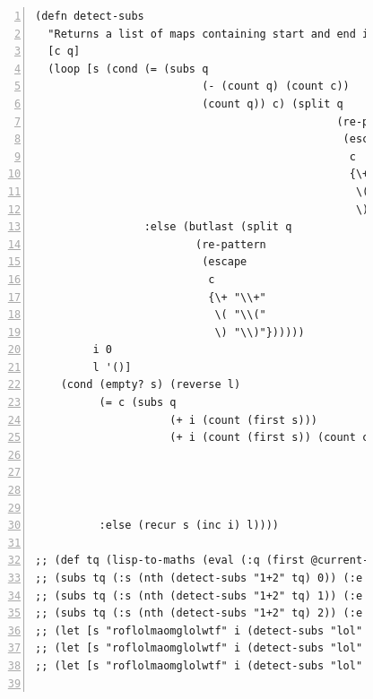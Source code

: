 \documentclass[12pt,twoside,notitlepage,xetex]{report}
\begin{document}
\begin{center}
\begin{figure}[H]
\begin{center}
\begin{minipage}{11.7cm}%
\begin{Verbatim}[fontsize=\tiny,numbers=left]
(defn detect-subs
  "Returns a list of maps containing start and end indices showing where a substring c appears in the superstring q."
  [c q]
  (loop [s (cond (= (subs q
                          (- (count q) (count c))
                          (count q)) c) (split q
                                               (re-pattern
                                                (escape
                                                 c
                                                 {\+ "\\+"
                                                  \( "\\("
                                                  \) "\\)"})))
                 :else (butlast (split q
                         (re-pattern
                          (escape
                           c
                           {\+ "\\+"
                            \( "\\("
                            \) "\\)"})))))
         i 0
         l '()]
    (cond (empty? s) (reverse l)
          (= c (subs q
                     (+ i (count (first s)))
                     (+ i (count (first s)) (count c)))) (recur (rest s)
                                                                (inc i)
                                                                (cons {:s (+ i (count (first s)))
                                                                       :e (+ i (count (first s)) (count c))}
                                                                      l))
          :else (recur s (inc i) l))))

;; (def tq (lisp-to-maths (eval (:q (first @current-qset)))))
;; (subs tq (:s (nth (detect-subs "1+2" tq) 0)) (:e (nth (detect-subs "1+2" tq) 0)))
;; (subs tq (:s (nth (detect-subs "1+2" tq) 1)) (:e (nth (detect-subs "1+2" tq) 1)))
;; (subs tq (:s (nth (detect-subs "1+2" tq) 2)) (:e (nth (detect-subs "1+2" tq) 2)))
;; (let [s "roflolmaomglolwtf" i (detect-subs "lol" s)] (subs s (:s (nth i 0)) (:e (nth i 0))))
;; (let [s "roflolmaomglolwtf" i (detect-subs "lol" s)] (subs s (:s (nth i 1)) (:e (nth i 1))))
;; (let [s "roflolmaomglolwtf" i (detect-subs "lol" s)] (subs s (:s (nth i 2)) (:e (nth i 2))))


\end{Verbatim}
\end{minipage}
\end{center}
\end{figure}
\end{center}
\end{document}
